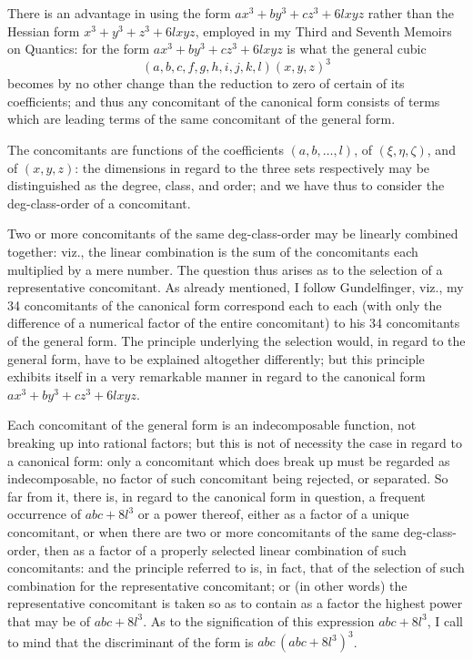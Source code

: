 \documentclass[11pt,a4paper]{article}
\begin{document}
There is an advantage in using the form $ax^{3}+by^{3}+cz^{3}+6lxyz$
rather than the Hessian form $x^{3}+y^{3}+z^{3}+6lxyz$, employed in my
Third and Seventh Memoirs on Quantics: for the form
$ax^{3}+by^{3}+cz^{3}+6lxyz$ is what the general cubic
\[
  (a,b,c,f,g,h,i,j,k,l)(x,y,z)^{3}
\]
becomes by no other change than the reduction to zero of certain of its
coefficients; and thus any concomitant of the canonical form consists
of terms which are leading terms of the same concomitant of the general
form.

The concomitants are functions of the coefficients $(a,b,\ldots,l)$,
of $(\xi,\eta,\zeta)$, and of $(x,y,z)$: the dimensions in regard to
the three sets respectively may be distinguished as the degree, class,
and order; and we have thus to consider the deg-class-order of a
concomitant.

Two or more concomitants of the same deg-class-order may be linearly
combined together: viz., the linear combination is the sum of the
concomitants each multiplied by a mere number. The question thus arises
as to the selection of a representative concomitant. As already
mentioned, I follow Gundelfinger, viz., my 34 concomitants of the
canonical form correspond each to each (with only the difference of a
numerical factor of the entire concomitant) to his 34 concomitants of
the general form. The principle underlying the selection would, in
regard to the general form, have to be explained altogether differently;
but this principle exhibits itself in a very remarkable manner in regard
to the canonical form $ax^{3}+by^{3}+cz^{3}+6lxyz$.

\newpage
\noindent
Each concomitant of the general form is an indecomposable function,
not breaking up into rational factors; but this is not of necessity the
case in regard to a canonical form: only a concomitant which does break
up must be regarded as indecomposable, no factor of such concomitant
being rejected, or separated. So far from it, there is, in regard to
the canonical form in question, a frequent occurrence of $abc+8l^{3}$
or a power thereof, either as a factor of a unique concomitant, or when
there are two or more concomitants of the same deg-class-order, then as
a factor of a properly selected linear combination of such
concomitants: and the principle referred to is, in fact, that of the
selection of such combination for the representative concomitant; or
(in other words) the representative concomitant is taken so as to
contain as a factor the highest power that may be of $abc+8l^{3}$. As
to the signification of this expression $abc+8l^{3}$, I call to mind
that the discriminant of the form is $abc\,(abc+8l^{3})^{3}$.
\end{document}
